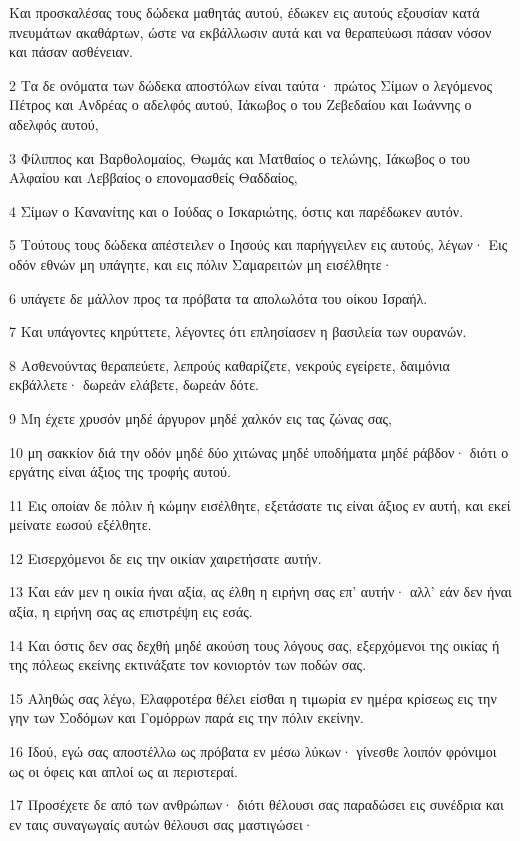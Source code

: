 \par Και προσκαλέσας τους δώδεκα μαθητάς αυτού, έδωκεν εις αυτούς εξουσίαν κατά πνευμάτων ακαθάρτων, ώστε να εκβάλλωσιν αυτά και να θεραπεύωσι πάσαν νόσον και πάσαν ασθένειαν.
\par 2 Τα δε ονόματα των δώδεκα αποστόλων είναι ταύτα· πρώτος Σίμων ο λεγόμενος Πέτρος και Ανδρέας ο αδελφός αυτού, Ιάκωβος ο του Ζεβεδαίου και Ιωάννης ο αδελφός αυτού,
\par 3 Φίλιππος και Βαρθολομαίος, Θωμάς και Ματθαίος ο τελώνης, Ιάκωβος ο του Αλφαίου και Λεββαίος ο επονομασθείς Θαδδαίος,
\par 4 Σίμων ο Κανανίτης και ο Ιούδας ο Ισκαριώτης, όστις και παρέδωκεν αυτόν.
\par 5 Τούτους τους δώδεκα απέστειλεν ο Ιησούς και παρήγγειλεν εις αυτούς, λέγων· Εις οδόν εθνών μη υπάγητε, και εις πόλιν Σαμαρειτών μη εισέλθητε·
\par 6 υπάγετε δε μάλλον προς τα πρόβατα τα απολωλότα του οίκου Ισραήλ.
\par 7 Και υπάγοντες κηρύττετε, λέγοντες ότι επλησίασεν η βασιλεία των ουρανών.
\par 8 Ασθενούντας θεραπεύετε, λεπρούς καθαρίζετε, νεκρούς εγείρετε, δαιμόνια εκβάλλετε· δωρεάν ελάβετε, δωρεάν δότε.
\par 9 Μη έχετε χρυσόν μηδέ άργυρον μηδέ χαλκόν εις τας ζώνας σας,
\par 10 μη σακκίον διά την οδόν μηδέ δύο χιτώνας μηδέ υποδήματα μηδέ ράβδον· διότι ο εργάτης είναι άξιος της τροφής αυτού.
\par 11 Εις οποίαν δε πόλιν ή κώμην εισέλθητε, εξετάσατε τις είναι άξιος εν αυτή, και εκεί μείνατε εωσού εξέλθητε.
\par 12 Εισερχόμενοι δε εις την οικίαν χαιρετήσατε αυτήν.
\par 13 Και εάν μεν η οικία ήναι αξία, ας έλθη η ειρήνη σας επ' αυτήν· αλλ' εάν δεν ήναι αξία, η ειρήνη σας ας επιστρέψη εις εσάς.
\par 14 Και όστις δεν σας δεχθή μηδέ ακούση τους λόγους σας, εξερχόμενοι της οικίας ή της πόλεως εκείνης εκτινάξατε τον κονιορτόν των ποδών σας.
\par 15 Αληθώς σας λέγω, Ελαφροτέρα θέλει είσθαι η τιμωρία εν ημέρα κρίσεως εις την γην των Σοδόμων και Γομόρρων παρά εις την πόλιν εκείνην.
\par 16 Ιδού, εγώ σας αποστέλλω ως πρόβατα εν μέσω λύκων· γίνεσθε λοιπόν φρόνιμοι ως οι όφεις και απλοί ως αι περιστεραί.
\par 17 Προσέχετε δε από των ανθρώπων· διότι θέλουσι σας παραδώσει εις συνέδρια και εν ταις συναγωγαίς αυτών θέλουσι σας μαστιγώσει·
